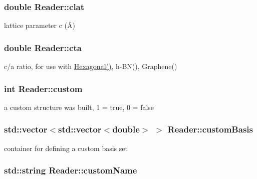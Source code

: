 \subsubsection[{clat}]{\setlength{\rightskip}{0pt plus 5cm}double Reader\+::clat}\label{class_reader_ad10c6e643d5cb651bed0c96790099b51}


lattice parameter c (Å) 

\hypertarget{class_reader_a6eb90d21148a08f9ef4e3dc478917d63}{}
\subsubsection[{cta}]{\setlength{\rightskip}{0pt plus 5cm}double Reader\+::cta}\label{class_reader_a6eb90d21148a08f9ef4e3dc478917d63}


c/a ratio, for use with \hyperlink{class_hexagonal}{Hexagonal()}, h-\/\+B\+N(), Graphene() 

\hypertarget{class_reader_aeffa187da9ac5feb5c3e5e078fe43fde}{}
\subsubsection[{custom}]{\setlength{\rightskip}{0pt plus 5cm}int Reader\+::custom}\label{class_reader_aeffa187da9ac5feb5c3e5e078fe43fde}


a custom structure was built, 1 = true, 0 = false 

\hypertarget{class_reader_a5f34996abadc7f998ffd1c34c4cfb380}{}
\subsubsection[{custom\+Basis}]{\setlength{\rightskip}{0pt plus 5cm}std\+::vector$<$std\+::vector$<$double$>$ $>$ Reader\+::custom\+Basis}\label{class_reader_a5f34996abadc7f998ffd1c34c4cfb380}


container for defining a custom basis set 

\hypertarget{class_reader_a5cad9d6f8773e4ca9e6ae63b4dd7a307}{}
\subsubsection[{custom\+Name}]{\setlength{\rightskip}{0pt plus 5cm}std\+::string Reader\+::custom\+Name}\label{class_reader_a5cad9d6f8773e4ca9e6ae63b4dd7a307}


